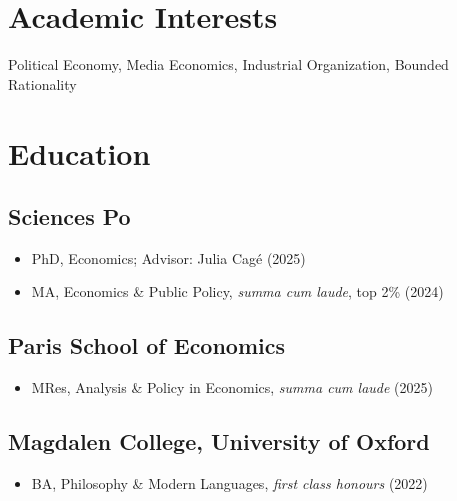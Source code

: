 \documentclass{cv_style}
\begin{document}


    \begin{center}  

    
	\end{center}
	
	\section{Academic Interests}
	Political Economy, Media Economics, Industrial Organization, Bounded Rationality

	\section{Education}
		\subsection{Sciences Po}
				\begin{itemize}
					\item PhD, Economics; Advisor: Julia Cagé (2025\textendash)
					\item MA, Economics \& Public Policy, \textit{summa cum laude}, top 2\% (2024)
				\end{itemize}
                
		\subsection{Paris School of Economics}
				\begin{itemize}
					\item MRes, Analysis \& Policy in Economics, \textit{summa cum laude} (2025)
				\end{itemize}
				
		\subsection{Magdalen College, University of Oxford}
				\begin{itemize}
					\item BA, Philosophy \& Modern Languages, \textit{first class honours} (2022)
				\end{itemize}
		
\end{document}
